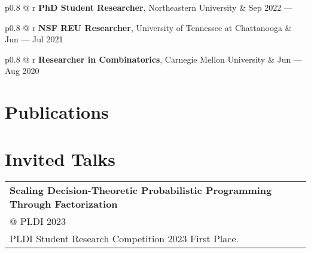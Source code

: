 \documentclass[12pt]{article}
\begin{document}
\begin{tabularx}{\linewidth}{p{0.8\textwidth} @{\extracolsep{\fill}} r}
  \textbf{PhD Student Researcher}, Northeastern University & Sep 2022 --- \\
\end{tabularx}

\begin{tabularx}{\textwidth}{p{0.8\textwidth} @{\extracolsep{\fill}} r}
\textbf{NSF REU Researcher}, University of Tennessee at Chattanooga & Jun --- Jul 2021
\end{tabularx}

\begin{tabularx}{\hsize}{p{0.8\textwidth} @{\extracolsep{\fill}} r}
\textbf{Researcher in Combinatorics}, Carnegie Mellon University & Jun --- Aug 2020 \\
\end{tabularx}

\section{Publications}

\nocite{*}
\printbibliography[heading=none]

\section{Invited Talks}

\begin{tabularx}{\linewidth}{ p{} @{\extracolsep{\fill}} r }
    \textbf{Scaling Decision-Theoretic Probabilistic Programming Through \newline Factorization} & \hfill \begin{tabular}{r}
        DRAGSTERS \\ @ PLDI 2023
    \end{tabular}\\[3pt]
    PLDI Student Research Competition 2023 First Place.
\end{tabularx}

\end{document}
